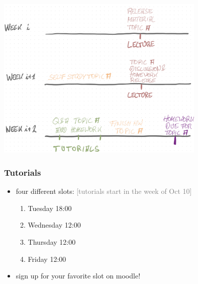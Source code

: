\documentclass[fleqn,10pt,serif,xcolor=svgnames,xcolor=table,aspectratio=169,handout]{beamer}
\newcommand{\mycom}[1]{\hfill {\mygray{[#1]}}}
\newcommand{\mygray}[1]{\textcolor{gray}{#1}}
\begin{document}
\begin{frame}

  \begin{center}
    \includegraphics[width=0.75\textwidth]{00-introduction-pics/timing-logic.png}
  \end{center}

\end{frame}

\begin{frame}
  \frametitle{Tutorials}
  \begin{itemize}
    \item four different slots: \hfill \mycom{tutorials start in the week of Oct 10}
    \begin{enumerate}


      \item {}           Tuesday 18:00
      \item {}           Wednesday 12:00
      \item {}  Thursday 12:00
      \item {}        Friday 12:00
    \end{enumerate}
    \item sign up for your favorite slot on moodle!
  \end{itemize}
\end{frame}
\end{document}
